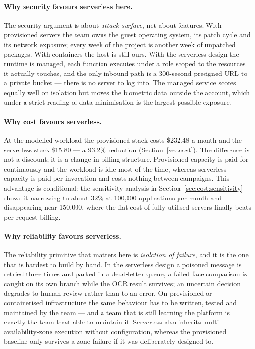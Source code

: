 \paragraph{Why security favours serverless here.}
The security argument is about \emph{attack surface}, not about features. With
provisioned servers the team owns the guest operating system, its patch cycle and
its network exposure; every week of the project is another week of unpatched
packages. With containers the host is still ours. With the serverless design the
runtime is managed, each function executes under a role scoped to the resources
it actually touches, and the only inbound path is a 300-second presigned URL to a
private bucket --- there is no server to log into. The managed service scores
equally well on isolation but moves the biometric data outside the account, which
under a strict reading of data-minimisation is the largest possible exposure.

\paragraph{Why cost favours serverless.}
At the modelled workload the provisioned stack costs \$232.48 a month and the
serverless stack \$15.80 --- a 93.2\% reduction (Section~\ref{sec:cost}). The
difference is not a discount; it is a change in billing structure. Provisioned
capacity is paid for continuously and the workload is idle most of the time,
whereas serverless capacity is paid per invocation and costs nothing between
campaigns. This advantage is conditional: the sensitivity analysis in
Section~\ref{sec:cost:sensitivity} shows it narrowing to about 32\% at
100{,}000 applications per month and disappearing near 150{,}000, where the flat
cost of fully utilised servers finally beats per-request billing.

\paragraph{Why reliability favours serverless.}
The reliability primitive that matters here is \emph{isolation of failure}, and
it is the one that is hardest to build by hand. In the serverless design a
poisoned message is retried three times and parked in a dead-letter queue; a
failed face comparison is caught on its own branch while the OCR result survives;
an uncertain decision degrades to human review rather than to an error. On
provisioned or containerised infrastructure the same behaviour has to be written,
tested and maintained by the team --- and a team that is still learning the
platform is exactly the team least able to maintain it. Serverless also inherits
multi-availability-zone execution without configuration, whereas the provisioned
baseline only survives a zone failure if it was deliberately designed to.

